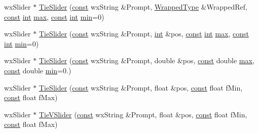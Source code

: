\begin{DoxyCompactItemize}
\item 
wx\+Slider $\ast$ \hyperlink{class_shuttle_gui_base_a7b9ce60871ea4da0361fced953f06992}{Tie\+Slider} (\hyperlink{getopt1_8c_a2c212835823e3c54a8ab6d95c652660e}{const} wx\+String \&Prompt, \hyperlink{class_wrapped_type}{Wrapped\+Type} \&Wrapped\+Ref, \hyperlink{getopt1_8c_a2c212835823e3c54a8ab6d95c652660e}{const} \hyperlink{xmltok_8h_a5a0d4a5641ce434f1d23533f2b2e6653}{int} \hyperlink{_t_d_stretch_8cpp_ac39d9cef6a5e030ba8d9e11121054268}{max}, \hyperlink{getopt1_8c_a2c212835823e3c54a8ab6d95c652660e}{const} \hyperlink{xmltok_8h_a5a0d4a5641ce434f1d23533f2b2e6653}{int} \hyperlink{_compare_audio_command_8cpp_abd8bbcfabb3ddef2ccaafb9928a37b95}{min}=0)
\item 
wx\+Slider $\ast$ \hyperlink{class_shuttle_gui_base_a8aad915a52e898c92ebf9a0261052668}{Tie\+Slider} (\hyperlink{getopt1_8c_a2c212835823e3c54a8ab6d95c652660e}{const} wx\+String \&Prompt, \hyperlink{xmltok_8h_a5a0d4a5641ce434f1d23533f2b2e6653}{int} \&pos, \hyperlink{getopt1_8c_a2c212835823e3c54a8ab6d95c652660e}{const} \hyperlink{xmltok_8h_a5a0d4a5641ce434f1d23533f2b2e6653}{int} \hyperlink{_t_d_stretch_8cpp_ac39d9cef6a5e030ba8d9e11121054268}{max}, \hyperlink{getopt1_8c_a2c212835823e3c54a8ab6d95c652660e}{const} \hyperlink{xmltok_8h_a5a0d4a5641ce434f1d23533f2b2e6653}{int} \hyperlink{_compare_audio_command_8cpp_abd8bbcfabb3ddef2ccaafb9928a37b95}{min}=0)
\item 
wx\+Slider $\ast$ \hyperlink{class_shuttle_gui_base_aa7e5a47b3eca9d70a158c81b5bf9a79a}{Tie\+Slider} (\hyperlink{getopt1_8c_a2c212835823e3c54a8ab6d95c652660e}{const} wx\+String \&Prompt, double \&pos, \hyperlink{getopt1_8c_a2c212835823e3c54a8ab6d95c652660e}{const} double \hyperlink{_t_d_stretch_8cpp_ac39d9cef6a5e030ba8d9e11121054268}{max}, \hyperlink{getopt1_8c_a2c212835823e3c54a8ab6d95c652660e}{const} double \hyperlink{_compare_audio_command_8cpp_abd8bbcfabb3ddef2ccaafb9928a37b95}{min}=0.)
\item 
wx\+Slider $\ast$ \hyperlink{class_shuttle_gui_base_a4919f0ce8a8c8da363de15923e4862d6}{Tie\+Slider} (\hyperlink{getopt1_8c_a2c212835823e3c54a8ab6d95c652660e}{const} wx\+String \&Prompt, float \&pos, \hyperlink{getopt1_8c_a2c212835823e3c54a8ab6d95c652660e}{const} float f\+Min, \hyperlink{getopt1_8c_a2c212835823e3c54a8ab6d95c652660e}{const} float f\+Max)
\item 
wx\+Slider $\ast$ \hyperlink{class_shuttle_gui_base_a6a3b8c5b3db7eed67a998184557d40a6}{Tie\+V\+Slider} (\hyperlink{getopt1_8c_a2c212835823e3c54a8ab6d95c652660e}{const} wx\+String \&Prompt, float \&pos, \hyperlink{getopt1_8c_a2c212835823e3c54a8ab6d95c652660e}{const} float f\+Min, \hyperlink{getopt1_8c_a2c212835823e3c54a8ab6d95c652660e}{const} float f\+Max)

\end{DoxyCompactItemize}
